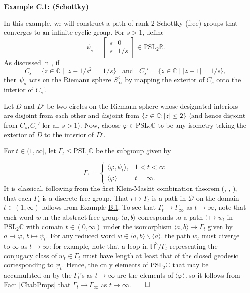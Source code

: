 \documentclass[11pt,leqno]{article}
\theoremstyle{introdef}
\numberwithin{lemma}{section}
\theoremstyle{definition}
\newcommand{\R}{\mathbb{R}}
\newcommand{\C}{\mathbb{C}}
\begin{document}
\vspace{0.1in}


\hypertarget{Ex-Schottky}{\textbf{Example C.1: (Schottky)}} In this example, we will construct a path of rank-2 Schottky (free) groups that converges to an infinite cyclic group. For $s>1$, define \[\psi_s=\begin{bmatrix}
s & 0 \\
s & 1/s 
\end{bmatrix}\in\mathrm{PSL}_2\R.\] As discussed in \cite{FORD}, if \[C_s=\{z\in\C \;|\; |z+1/s^2|=1/s\}\;\;\text{ and }\;\;C_s'=\{z\in\C \;|\; |z-1|=1/s\},\] then $\psi_s$ acts on the Riemann sphere $S^2_\infty$ by mapping the exterior of $C_s$ onto the interior of $C_s'$.\par

Let $D$ and $D'$ be two circles on the Riemann sphere whose designated interiors are disjoint from each other and disjoint from $\{z\in\C:|z|\leq 2\}$ (and hence disjoint from $C_s,C_s'$ for all $s>1$). Now, choose $\varphi\in\mathrm{PSL}_2\C$ to be any isometry taking the exterior of $D$ to the interior of $D'$.\par

For $t\in(1,\infty]$, let $\Gamma_t\leq\mathrm{PSL}_2\C$ be the subgroup given by

\[ \Gamma_t = 
    \begin{cases} 
      \langle\varphi,\psi_t\rangle, & 1<t<\infty \\
      \langle\varphi\rangle, & t=\infty .
   \end{cases}
\]
It is classical, following from the first Klein-Maskit combination theorem (\cite{MAT}, \cite{MASK}, \cite{ABI}), that each $\Gamma_t$ is a discrete free group. That $t\mapsto\Gamma_t$ is a path in $\mathcal{D}$ on the domain $t\in(1,\infty)$ follows from Example \hyperlink{Ex-QCDef}{B.1}. To see that $\Gamma_t\rightarrow\Gamma_\infty$ as $t\rightarrow\infty$, note that each word $w$ in the abstract free group $\langle a,b\rangle$ corresponds to a path $t\mapsto w_t$ in $\mathrm{PSL}_2\C$ with domain $t\in(0,\infty)$ under the isomorphism $\langle a,b\rangle\rightarrow \Gamma_t$ given by $a\mapsto\varphi$, $b\mapsto\psi_t$. For any reduced word $w\in\langle a,b\rangle\backslash \langle a\rangle$, the path $w_t$ must diverge to $\infty$ as $t\rightarrow\infty$; for example, note that a loop in $\mathbb{H}^3/\Gamma_t$ representing the conjugacy class of $w_t\in\Gamma_t$ must have length at least that of the closed geodesic corresponding to $\psi_t$. Hence, the only elements of $\mathrm{PSL}_2\C$ that may be accumulated on by the $\Gamma_t$'s as $t\rightarrow\infty$ are the elements of $\langle \varphi\rangle$, so it follows from Fact \ref{ChabProps} that $\Gamma_t\rightarrow\Gamma_\infty$ as $t\rightarrow \infty$.$\qed$\par
\end{document}
